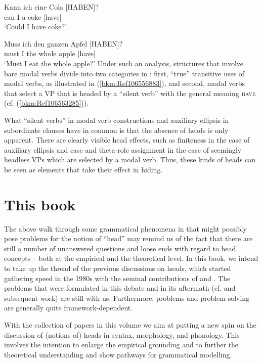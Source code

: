 \documentclass[output=paper
  ,nobabel
  ,draftmode
  ,colorlinks, citecolor=brown
]{langscibook}
\begin{document}
\ex
\gll Kann  ich  eine   Cola  [\MakeUppercase{haben}]?\\
       can     I      a       coke   [have]\\
\glt   `Could I have coke?'

\ex
\gll Muss   ich   den    ganzen    Apfel   [\MakeUppercase{haben}]?\\
       must    I      the     whole      apple   [have]\\
\glt   `Must I eat the whole apple?'
\zl
\noindent
Under such an analysis, structures that involve bare modal verbs divide into two categories in
: first, ``true'' transitive uses of modal verbs, as illustrated in (\ref{bkm:Ref106556883}),
and second, modal verbs that select a VP that is headed by a ``silent verb'' with the general meaning
\textsc{have} (cf. (\ref{bkm:Ref106563285})).

What ``silent verbs'' in modal verb constructions and auxiliary ellipsis in subordinate clauses have
in common is that the absence of heads is only apparent. There are clearly visible head effects,
such as finiteness in the case of auxiliary ellipsis and case and theta-role assignment in the case
of seemingly headless VPs which are selected by a modal verb. Thus, these kinds of heads can be seen
as elements that take their effect in hiding.

\section{This book}

The above walk through some grammatical phenomena in  that might possibly pose problems for
the notion of ``head'' may remind us of the fact that there are still a number of unanswered questions
and loose ends with regard to head concepts – both at the empirical and the theoretical level. In
this book, we intend to take up the thread of the previous discussions on heads, which started
gathering speed in the 1980s with the seminal contributions of \citet{Zwicky85a} and
\citet{Hudson1987}. The problems that were formulated in this debate and in its aftermath
(cf. \citealt{CorbettEtAl1993} and subsequent work) are still with us. Furthermore, problems and
problem-solving are generally quite framework-dependent.

With the collection of papers in this volume we aim at putting a new spin on the discussion of
(notions of) heads in syntax, morphology, and phonology. This involves the intention to enlarge the
empirical grounding and to further the theoretical understanding and show pathways for grammatical
modelling.
\end{document}
